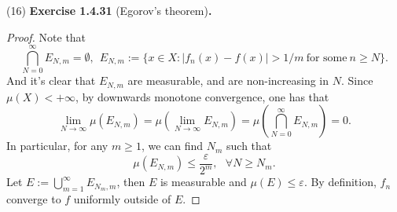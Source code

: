 \documentclass[a4paper]{article}
\begin{document}
(16) {\bfseries Exercise 1.4.31} (Egorov's theorem){\bfseries .}\begin{proof}
Note that $$
\bigcap_{N = 0}^\infty E_{N,m} = \emptyset,\ \ E_{N,m} := \{x \in X : |f_n(x) - f(x)| > 1 / m\ \text{for some}\ n \geq N\}.
$$
And it's clear that $E_{N, m}$ are measurable, and are non-increasing in $N$. Since $\mu(X) < +\infty$, by downwards monotone 
convergence, one has that$$
\lim_{N \to \infty} \mu(E_{N, m}) = \mu(\lim_{N \to \infty} E_{N, m}) = \mu(\bigcap_{N = 0}^\infty E_{N, m}) = 0.
$$In particular, for any $m \geq 1$, we can find $N_m$ such that $$
\mu(E_{N, m}) \leq \frac{\varepsilon}{2^m},\ \ \ \forall N \geq N_m.
$$Let $E := \bigcup_{m = 1}^\infty E_{N_m, m}$, then $E$ is measurable and $\mu(E) \leq \varepsilon$. By definition, 
$f_n$ converge to $f$ uniformly outside of $E$.
\end{proof}
\end{document}
